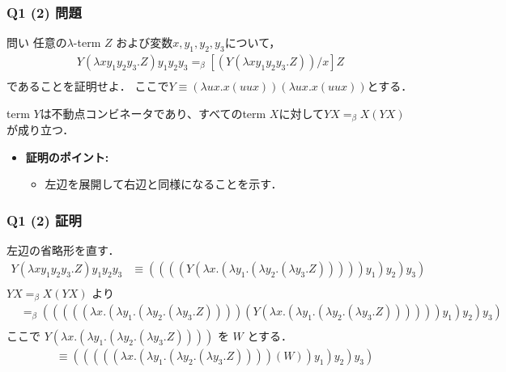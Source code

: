 \begin{frame}
    \frametitle{Q1 (2) 問題}
    \begin{alertblock}{問い}
    任意の$\lambda$-term $Z$ および変数$x,y_1,y_2,y_3$について，
    \begin{align*}
        Y(\lambda xy_1y_2y_3.Z)y_1y_2y_3 =_{\beta} [(Y(\lambda xy_1y_2y_3.Z))/x]Z \\
    \end{align*}
    であることを証明せよ． ここで$Y \equiv (\lambda ux.x(uux))(\lambda ux.x(uux))$とする．

    term $Y$は不動点コンビネータであり、すべてのterm $X$に対して$YX =_{\beta} X(YX)$が成り立つ．
    \end{alertblock}
    \begin{itemize}
    \item \textbf{証明のポイント:} 
        \begin{itemize}
        \item 左辺を展開して右辺と同様になることを示す．
        \end{itemize}
    \end{itemize}
\end{frame}

\begin{frame}
    \frametitle{Q1 (2) 証明}
    左辺の省略形を直す．
    \begin{align*}
        Y(\lambda xy_1y_2y_3.Z)y_1y_2y_3 &\equiv ((((Y(\lambda x.(\lambda y_1.(\lambda y_2.(\lambda y_3.Z)))))y_1)y_2)y_3) \\
    \end{align*}
    $YX =_{\beta} X(YX)$ より
    \begin{align*}
        &=_{\beta} (((((\lambda x.(\lambda y_1.(\lambda y_2.(\lambda y_3.Z))))(Y(\lambda x.(\lambda y_1.(\lambda y_2.(\lambda y_3.Z))))))y_1)y_2)y_3) \\
    \end{align*}
            ここで $Y(\lambda x.(\lambda y_1.(\lambda y_2.(\lambda y_3.Z))))$ を $W$ とする．
    \begin{align*}
        &\equiv (((((\lambda x.(\lambda y_1.(\lambda y_2.(\lambda y_3.Z))))(W))y_1)y_2)y_3) \\
    \end{align*}
\end{frame}

